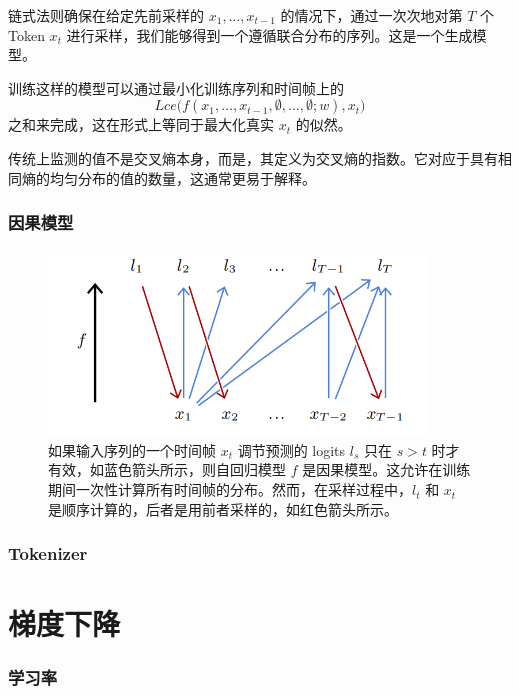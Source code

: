 链式法则确保在给定先前采样的 $x_1,\dots,x_{t-1}$ 的情况下，通过一次次地对第 $T$ 个 Token $x_t$ 进行采样，我们能够得到一个遵循联合分布的序列。这是一个生成模型。

训练这样的模型可以通过最小化训练序列和时间帧上的
\[Lce\big(f(x_1,\dots,x_{t-1},\emptyset,\dots,\emptyset;w),x_t\big)\]
之和来完成，这在形式上等同于最大化真实 $x_t$ 的似然。

传统上监测的值不是交叉熵本身，而是，其定义为交叉熵的指数。它对应于具有相同熵的均匀分布的值的数量，这通常更易于解释。

\subsubsection*{因果模型}

\begin{figure}
    \centering
    \includegraphics[width=0.9\textwidth]{fig/fig3.1.png}
    \caption[因果自回归模型]{如果输入序列的一个时间帧 $x_t$ 调节预测的 logits $l_s$ 只在 $s > t$ 时才有效，如蓝色箭头所示，则自回归模型 $f$ 是因果模型。这允许在训练期间一次性计算所有时间帧的分布。然而，在采样过程中，$l_t$ 和 $x_t$ 是顺序计算的，后者是用前者采样的，如红色箭头所示。}
    \label{fig3.1}
\end{figure}

\subsubsection*{Tokenizer}

\section{梯度下降}\label{sec3.3}

\subsubsection*{学习率}


